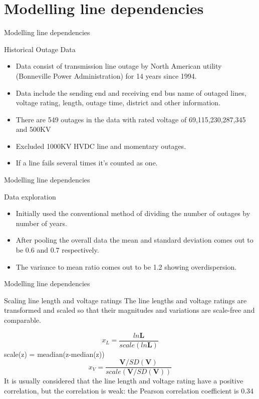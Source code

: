 \documentclass{beamer}
\begin{document}
\section{Modelling line dependencies}
\begin{frame}{Modelling line dependencies}
\begin{block}{Historical Outage Data}
\begin{itemize}
    \item Data consist of transmission line outage by North American utility (Bonneville Power Administration) for 14 years since 1994.
    \item Data include the sending end and receiving end bus name of outaged lines, voltage rating, length, outage time, district and other information.
    \item There are 549 outages in the data with rated voltage of 69,115,230,287,345 and 500KV
    \item Excluded 1000KV HVDC line and momentary outages.
    \item If a line fails several times it's counted as one. 
\end{itemize}

\end{block}
   \end{frame}
   
 \begin{frame}{Modelling line dependencies}
\begin{block}{Data exploration}
\begin{itemize}
    \item Initially used the conventional method of dividing the number of outages by number of years.
    \item After pooling the overall data the mean and standard deviation comes out to be 0.6 and 0.7 respectively.
    \item The variance to mean ratio comes out to be 1.2 showing overdispersion.
    
\end{itemize}

\end{block}
   \end{frame}
   
 \begin{frame}{Modelling line dependencies}
\begin{block}{Scaling line length and voltage ratings}
 The line lengths and voltage ratings are transformed and scaled so that their magnitudes and variations are scale-free and comparable.
  
 \begin{equation}
     x_L = \frac{ln \boldsymbol{L}}{scale(ln\boldsymbol{L})} 
 \end{equation}
scale(z) = meadian(z-median(z))
 \begin{equation}
     x_V = \frac{\boldsymbol{V}/SD(\boldsymbol{V})}{scale(\boldsymbol{V}/SD(\boldsymbol{V}))} 
 \end{equation}
 It is usually considered that the line length and voltage rating have a positive correlation, but the correlation is weak: the Pearson correlation coefficient is 0.34
\end{block}
 \end{frame}  
 
\end{document}
